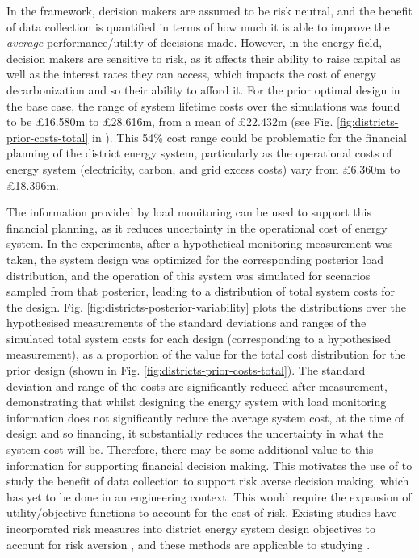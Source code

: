 In the  framework, decision makers are assumed to be risk neutral, and the benefit of data collection is quantified in terms of how much it is able to improve the \textit{average} performance/utility of decisions made. However, in the energy field, decision makers are sensitive to risk, as it affects their ability to raise capital as well as the interest rates they can access, which impacts the cost of energy decarbonization and so their ability to afford it.
For the prior optimal design in the base case, the range of system lifetime costs over the simulations was found to be £16.580m to £28.616m, from a mean of £22.432m (see Fig. \ref{fig:districts-prior-costs-total} in ). This 54\% cost range could be problematic for the financial planning of the district energy system, particularly as the operational costs of energy system (electricity, carbon, and grid excess costs) vary from £6.360m to £18.396m.

The information provided by load monitoring can be used to support this financial planning, as it reduces uncertainty in the operational cost of energy system. In the experiments, after a hypothetical monitoring measurement was taken, the system design was optimized for the corresponding posterior load distribution, and the operation of this system was simulated for scenarios sampled from that posterior, leading to a distribution of total system costs for the design. Fig. \ref{fig:districts-posterior-variability} plots the distributions over the hypothesised measurements of the standard deviations and ranges of the simulated total system costs for each design (corresponding to a hypothesised measurement), as a proportion of the value for the total cost distribution for the prior design (shown in Fig. \ref{fig:districts-prior-costs-total}). The standard deviation and range of the costs are significantly reduced after measurement, demonstrating that whilst designing the energy system with load monitoring information does not significantly reduce the average system cost, at the time of design and so financing, it substantially reduces the uncertainty in what the system cost will be. Therefore, there may be some additional value to this information for supporting financial decision making. This motivates the use of  to study the benefit of data collection to support risk averse decision making, which has yet to be done in an engineering context. This would require the expansion of utility/objective functions to account for the cost of risk. Existing studies have incorporated risk measures into district energy system design objectives to account for risk aversion \citep{pickering2019PracticalOptimisationDistrict}, and these methods are applicable to studying .\\

